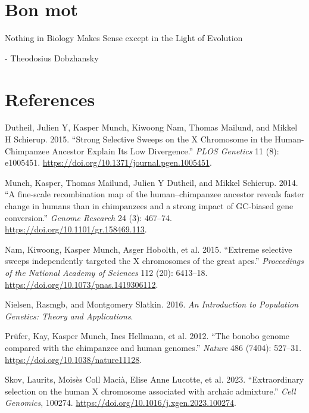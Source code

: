 \documentclass[
  10pt,
  a4paper,
]{scrbook}
\newlength{\cslhangindent}
\newenvironment{CSLReferences}[2] %
 {\begin{list}{}{%
  \setlength{\itemindent}{0pt}
  \setlength{\leftmargin}{0pt}
  \setlength{\parsep}{0pt}
  \ifodd #1
   \setlength{\leftmargin}{\cslhangindent}
   \setlength{\itemindent}{-1\cslhangindent}
  \fi
  \setlength{\itemsep}{#2\baselineskip}}}
 {\end{list}}
\renewenvironment{quote}{\begin{myquote}}{\end{myquote}}
\let\oldemph\emph
\renewcommand\emph[1]{\oldemph{\color{gray}#1}} %
\begin{document}
\chapter{Bon mot}\label{bon-mot}

\begin{quote}
Nothing in Biology Makes Sense except in the Light of Evolution

- Theodosius Dobzhansky
\end{quote}

\chapter{References}\label{references}

\protect{}\label{refs}
\begin{CSLReferences}{1}{1}
Dutheil, Julien Y, Kasper Munch, Kiwoong Nam, Thomas Mailund, and Mikkel
H Schierup. 2015. {``{Strong Selective Sweeps on the X Chromosome in the
Human-Chimpanzee Ancestor Explain Its Low Divergence}.''} \emph{PLOS
Genetics} 11 (8): e1005451.
\url{https://doi.org/10.1371/journal.pgen.1005451}.

Munch, Kasper, Thomas Mailund, Julien Y Dutheil, and Mikkel Schierup.
2014. {``{A fine-scale recombination map of the human--chimpanzee
ancestor reveals faster change in humans than in chimpanzees and a
strong impact of GC-biased gene conversion}.''} \emph{Genome Research}
24 (3): 467--74. \url{https://doi.org/10.1101/gr.158469.113}.

Nam, Kiwoong, Kasper Munch, Asger Hobolth, et al. 2015. {``{Extreme
selective sweeps independently targeted the X chromosomes of the great
apes}.''} \emph{Proceedings of the National Academy of Sciences} 112
(20): 6413--18. \url{https://doi.org/10.1073/pnas.1419306112}.

Nielsen, Rasmgb, and Montgomery Slatkin. 2016. \emph{An Introduction to
Population Genetics: Theory and Applications}.

Prüfer, Kay, Kasper Munch, Ines Hellmann, et al. 2012. {``{The bonobo
genome compared with the chimpanzee and human genomes}.''} \emph{Nature}
486 (7404): 527--31. \url{https://doi.org/10.1038/nature11128}.

Skov, Laurits, Moisès Coll Macià, Elise Anne Lucotte, et al. 2023.
{``{Extraordinary selection on the human X chromosome associated with
archaic admixture}.''} \emph{Cell Genomics}, 100274.
\url{https://doi.org/10.1016/j.xgen.2023.100274}.

\end{CSLReferences}


\backmatter
\end{document}
